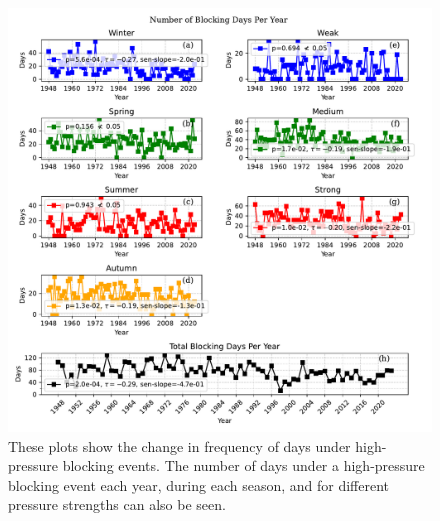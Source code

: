 \begin{figure}[H]
    \centering
    \includegraphics[width=\textwidth]{Figures/blocking_days_per_year_all.pdf}
    \caption{These plots show the change in frequency of days under high-pressure blocking events. The number of days under a high-pressure blocking event each year, during each season, and for different pressure strengths can also be seen.}
    \label{fig:Number_of_Blocking_Days_Per_Year}
\end{figure}






